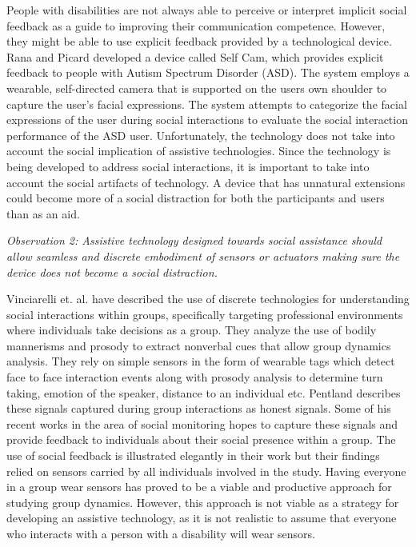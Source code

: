 \documentclass[oneside,11pt]{memoir}
\begin{document}
People with disabilities are not always able to perceive or interpret implicit social feedback as a guide to improving their communication competence.  However, they might be able to use explicit feedback provided by a technological device.  Rana and Picard \cite{teeters_self-cam:_2006} developed a device called Self Cam, which provides explicit feedback to people with Autism Spectrum Disorder (ASD).  The system employs a wearable, self-directed camera that is supported on the users own shoulder to capture the user's facial expressions. The system attempts to categorize the facial expressions of the user during social interactions to evaluate the social interaction performance of the ASD user.  Unfortunately, the technology does not take into account the social implication of assistive technologies. Since the technology is being developed to address social interactions, it is important to take into account the social artifacts of technology. A device that has unnatural extensions could become more of a social distraction for both the participants and users than as an aid.


\emph{Observation 2: Assistive technology designed towards social assistance should allow seamless and discrete embodiment of sensors or actuators making sure the device does not become a social distraction.}

Vinciarelli et. al. \cite{vinciarelli_social_2008} have described the use of discrete technologies for understanding social interactions within groups, specifically targeting professional environments where individuals take decisions as a group. They analyze the use of bodily mannerisms and prosody to extract nonverbal cues that allow group dynamics analysis. They rely on simple sensors in the form of wearable tags \cite{kim_meeting_2008} which detect face to face interaction events along with prosody analysis to determine turn taking, emotion of the speaker, distance to an individual etc. Pentland describes these signals captured during group interactions as \cite{pentland_honest_2008} honest signals. Some of his recent works \cite{vinciarelli_social_2008-1} in the area of social monitoring hopes to capture these signals and provide feedback to individuals about their social presence within a group. The use of social feedback is illustrated elegantly in their work but their findings relied on sensors carried by all individuals involved in the study. Having everyone in a group wear sensors has proved to be a viable and productive approach for studying group dynamics.  However, this approach is not viable as a strategy for developing an assistive technology, as it is not realistic to assume that everyone who interacts with a person with a disability will wear sensors.
\end{document}
